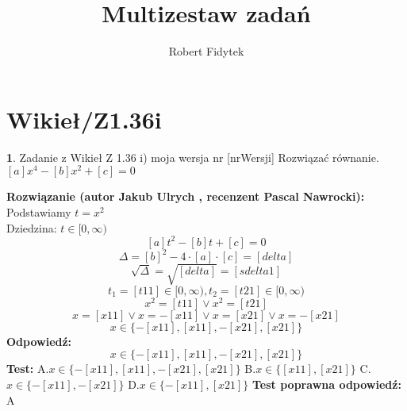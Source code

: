 \documentclass[12pt, a4paper]{article}
\title{Multizestaw zadań}
\author{Robert Fidytek}
\date{}
\theoremstyle{definition} %
\newtheorem{zad}{}
\newcommand{\kategoria}[1]{\section{#1}} %
\newcommand{\zadStart}[1]{\begin{zad}#1\newline} %
\newcommand{\zadStop}{\end{zad}}   %
\newcommand{\rozwStart}[2]{\noindent \textbf{Rozwiązanie (autor #1 , recenzent #2): }\newline} %
\newcommand{\rozwStop}{\newline}                                            %
\newcommand{\odpStart}{\noindent \textbf{Odpowiedź:}\newline}    %
\newcommand{\odpStop}{\newline}                                             %
\newcommand{\testStart}{\noindent \textbf{Test:}\newline} %
\newcommand{\testStop}{\newline} %
\newcommand{\kluczStart}{\noindent \textbf{Test poprawna odpowiedź:}\newline} %
\newcommand{\kluczStop}{\newline} %
\begin{document}
\maketitle


\kategoria{Wikieł/Z1.36i}
\zadStart{Zadanie z Wikieł Z 1.36 i) moja wersja nr [nrWersji]}
Rozwiązać równanie. $[a]x^{4}-[b]x^{2}+[c]=0$
\zadStop
\rozwStart{Jakub Ulrych}{Pascal Nawrocki}
Podstawiamy $t=x^{2}$\\
Dziedzina: $t\in[0,\infty)$
$$[a]t^{2}-[b]t+[c]=0$$
$$\Delta=[b]^{2}-4\cdot[a]\cdot[c]=[delta]$$
$$\sqrt{\Delta}=\sqrt{[delta]}=[sdelta1]$$
$$t_{1}=[t11]\in[0,\infty),t_{2}=[t21]\in[0,\infty)$$
$$x^{2}=[t11]\vee x^{2}=[t21]$$
$$x=[x11]\vee x=-[x11]\vee x=[x21]\vee x=-[x21]$$
$$x\in\{-[x11],[x11],-[x21],[x21]\}$$
\rozwStop
\odpStart
$$x\in\{-[x11],[x11],-[x21],[x21]\}$$
\odpStop
\testStart
A.$x\in\{-[x11],[x11],-[x21],[x21]\}$
B.$x\in\{[x11],[x21]\}$
C.$x\in\{-[x11],-[x21]\}$
D.$x\in\{-[x11],[x21]\}$
\testStop
\kluczStart
A
\kluczStop
\end{document}
